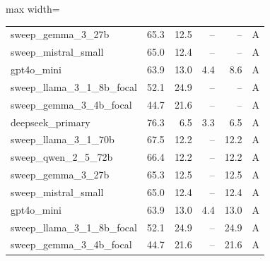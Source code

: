 \begin{table}[t]
\begin{adjustbox}{max width=\linewidth}
\begin{tabular}{@{}lrrrrc@{}}
sweep\_gemma\_3\_27b & 65.3 & 12.5 & -- & -- & A \\
sweep\_mistral\_small & 65.0 & 12.4 & -- & -- & A \\
gpt4o\_mini & 63.9 & 13.0 & 4.4 & 8.6 & A \\
sweep\_llama\_3\_1\_8b\_focal & 52.1 & 24.9 & -- & -- & A \\
sweep\_gemma\_3\_4b\_focal & 44.7 & 21.6 & -- & -- & A \\
deepseek\_primary & 76.3 & 6.5 & 3.3 & 6.5 & A \\
sweep\_llama\_3\_1\_70b & 67.5 & 12.2 & -- & 12.2 & A \\
sweep\_qwen\_2\_5\_72b & 66.4 & 12.2 & -- & 12.2 & A \\
sweep\_gemma\_3\_27b & 65.3 & 12.5 & -- & 12.5 & A \\
sweep\_mistral\_small & 65.0 & 12.4 & -- & 12.4 & A \\
gpt4o\_mini & 63.9 & 13.0 & 4.4 & 13.0 & A \\
sweep\_llama\_3\_1\_8b\_focal & 52.1 & 24.9 & -- & 24.9 & A \\
sweep\_gemma\_3\_4b\_focal & 44.7 & 21.6 & -- & 21.6 & A \\
\bottomrule
\end{tabular}
\end{adjustbox}
\end{table}
